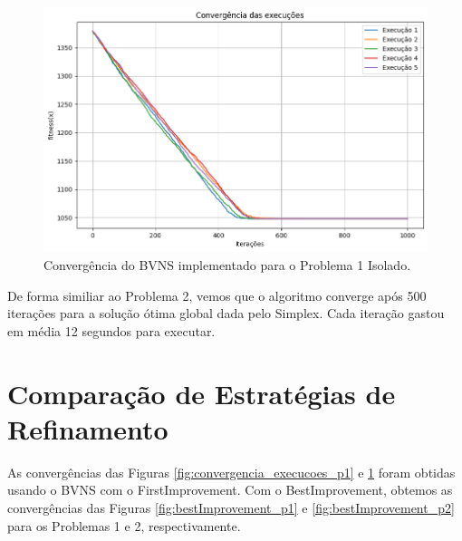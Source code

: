 \documentclass[
	12pt,				%
	oneside,			%
	a4paper,			%
	chapter=TITLE,
	sumario=tradicional,
	english,			%
	brazil				%
]{abntex2}
\begin{document}
\begin{figure}[h!]
	\caption{\label{fig:convergencia_execucoes}Convergência do BVNS implementado para o Problema 1 Isolado.}
	\begin{center}
    \includegraphics[width=\textwidth,trim=1 1 1 1,clip]{convergencia_execucoes.png}
	\end{center}
\end{figure}

De forma similiar ao Problema 2, vemos que o algoritmo converge após 500 iterações para a solução 
ótima global dada pelo Simplex. Cada iteração gastou em média 12 segundos para executar.

\section{Comparação de Estratégias de Refinamento}

As convergências das Figuras \ref{fig:convergencia_execucoes_p1} e \ref{fig:convergencia_execucoes}
foram obtidas usando o BVNS com o FirstImprovement. Com o BestImprovement, obtemos 
as convergências das Figuras \ref{fig:bestImprovement_p1} e \ref{fig:bestImprovement_p2} para os Problemas 1 e 2, 
respectivamente.
\end{document}
